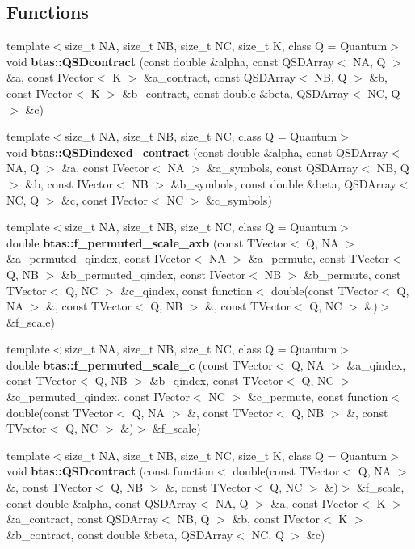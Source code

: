 \subsection*{Functions}
\begin{DoxyCompactItemize}
\item 
{\footnotesize template$<$size\-\_\-t N\-A, size\-\_\-t N\-B, size\-\_\-t N\-C, size\-\_\-t K, class Q  = Quantum$>$ }\\void {\bf btas\-::\-Q\-S\-Dcontract} (const double \&alpha, const Q\-S\-D\-Array$<$ N\-A, Q $>$ \&a, const I\-Vector$<$ K $>$ \&a\-\_\-contract, const Q\-S\-D\-Array$<$ N\-B, Q $>$ \&b, const I\-Vector$<$ K $>$ \&b\-\_\-contract, const double \&beta, Q\-S\-D\-Array$<$ N\-C, Q $>$ \&c)
\item 
{\footnotesize template$<$size\-\_\-t N\-A, size\-\_\-t N\-B, size\-\_\-t N\-C, class Q  = Quantum$>$ }\\void {\bf btas\-::\-Q\-S\-Dindexed\-\_\-contract} (const double \&alpha, const Q\-S\-D\-Array$<$ N\-A, Q $>$ \&a, const I\-Vector$<$ N\-A $>$ \&a\-\_\-symbols, const Q\-S\-D\-Array$<$ N\-B, Q $>$ \&b, const I\-Vector$<$ N\-B $>$ \&b\-\_\-symbols, const double \&beta, Q\-S\-D\-Array$<$ N\-C, Q $>$ \&c, const I\-Vector$<$ N\-C $>$ \&c\-\_\-symbols)
\item 
{\footnotesize template$<$size\-\_\-t N\-A, size\-\_\-t N\-B, size\-\_\-t N\-C, class Q  = Quantum$>$ }\\double {\bf btas\-::f\-\_\-permuted\-\_\-scale\-\_\-axb} (const T\-Vector$<$ Q, N\-A $>$ \&a\-\_\-permuted\-\_\-qindex, const I\-Vector$<$ N\-A $>$ \&a\-\_\-permute, const T\-Vector$<$ Q, N\-B $>$ \&b\-\_\-permuted\-\_\-qindex, const I\-Vector$<$ N\-B $>$ \&b\-\_\-permute, const T\-Vector$<$ Q, N\-C $>$ \&c\-\_\-qindex, const function$<$ double(const T\-Vector$<$ Q, N\-A $>$ \&, const T\-Vector$<$ Q, N\-B $>$ \&, const T\-Vector$<$ Q, N\-C $>$ \&)$>$ \&f\-\_\-scale)
\item 
{\footnotesize template$<$size\-\_\-t N\-A, size\-\_\-t N\-B, size\-\_\-t N\-C, class Q  = Quantum$>$ }\\double {\bf btas\-::f\-\_\-permuted\-\_\-scale\-\_\-c} (const T\-Vector$<$ Q, N\-A $>$ \&a\-\_\-qindex, const T\-Vector$<$ Q, N\-B $>$ \&b\-\_\-qindex, const T\-Vector$<$ Q, N\-C $>$ \&c\-\_\-permuted\-\_\-qindex, const I\-Vector$<$ N\-C $>$ \&c\-\_\-permute, const function$<$ double(const T\-Vector$<$ Q, N\-A $>$ \&, const T\-Vector$<$ Q, N\-B $>$ \&, const T\-Vector$<$ Q, N\-C $>$ \&)$>$ \&f\-\_\-scale)
\item 
{\footnotesize template$<$size\-\_\-t N\-A, size\-\_\-t N\-B, size\-\_\-t N\-C, size\-\_\-t K, class Q  = Quantum$>$ }\\void {\bf btas\-::\-Q\-S\-Dcontract} (const function$<$ double(const T\-Vector$<$ Q, N\-A $>$ \&, const T\-Vector$<$ Q, N\-B $>$ \&, const T\-Vector$<$ Q, N\-C $>$ \&)$>$ \&f\-\_\-scale, const double \&alpha, const Q\-S\-D\-Array$<$ N\-A, Q $>$ \&a, const I\-Vector$<$ K $>$ \&a\-\_\-contract, const Q\-S\-D\-Array$<$ N\-B, Q $>$ \&b, const I\-Vector$<$ K $>$ \&b\-\_\-contract, const double \&beta, Q\-S\-D\-Array$<$ N\-C, Q $>$ \&c)

\end{DoxyCompactItemize}
